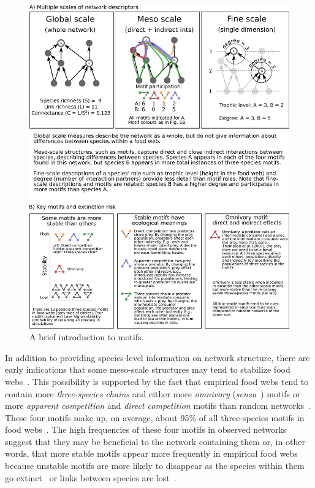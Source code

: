 \documentclass[12pt]{article}
\begin{document}
    \begin{figure}[h!]
        \includegraphics[width=.9\textwidth]{figures/motifs_box.eps}
        \caption{A brief introduction to motifs.}
        \label{motifs}
    \end{figure}
	
    In addition to providing species-level information on network structure, there are early indications that some meso-scale structures may tend to stabilize food webs~\citep{Prill2005,Borrelli2015,Monteiro2016}. 
    This possibility is supported by the fact that empirical food webs tend to contain more \emph{three-species chains} and either more \emph{omnivory} (\emph{sensu}~\citealp[]{Thompson2007b}) motifs or more \emph{apparent competition} and \emph{direct competition} motifs than random networks~\citep{Stouffer2007}. 
    These four motifs make up, on average, about 95\% of all three-species motifs in food webs~\citep{Stouffer2010b}. 
    The high frequencies of these four motifs in observed networks suggest that they may be beneficial to the network containing them or, in other words, that more stable motifs appear more frequently in empirical food webs because unstable motifs are more likely to disappear as the species within them go extinct~\citep{Borrelli2015,Borrelli2015a} or links between species are lost~\citep{Tylianakis2010}.
\end{document}
